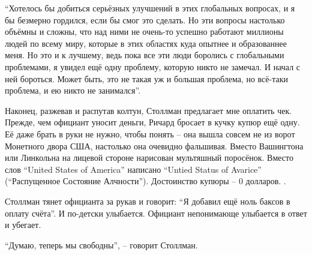 \enquote{Хотелось бы добиться серьёзных улучшений в этих глобальных вопросах, и я бы безмерно гордился, если бы смог это сделать. Но эти вопросы настолько объёмны и сложны, что над ними не очень-то успешно работают миллионы людей по всему миру, которые в этих областях куда опытнее и образованнее меня. Но это и к лучшему, ведь пока все эти люди боролись с глобальными проблемами, я увидел ещё одну проблему, которую никто не замечал. И начал с ней бороться. Может быть, это не такая уж и большая проблема, но всё-таки проблема, и ею никто не занимался}.

Наконец, разжевав и распутав колтун, Столлман предлагает мне оплатить чек. Прежде, чем официант уносит деньги, Ричард бросает в кучку купюр ещё одну. Её даже брать в руки не нужно, чтобы понять -- она вышла совсем не из ворот Монетного двора США, настолько она очевидно фальшивая. Вместо Вашингтона или Линкольна на лицевой стороне нарисован мультяшный поросёнок. Вместо слов \enquote{United States of America} написано \enquote{Untied Status of Avarice} (\enquote{Распущенное Состояние Алчности}). Достоинство купюры -- 0 долларов. .

Столлман тянет официанта за рукав и говорит: \enquote{Я добавил ещё ноль баксов в оплату счёта}. И по-детски улыбается. Официант непонимающе улыбается в ответ и убегает.

\enquote{Думаю, теперь мы свободны}, -- говорит Столлман.

\theendnotes
\setcounter{endnote}{0}
